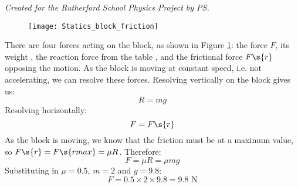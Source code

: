 
\begin{problem}
{}
{\textit{Created for the Rutherford School Physics Project by PS.}}
{
\begin{figure}
	\centering
	\texttt{[image: Statics\_block\_friction]}
	\caption{}
	\label{fig:Statics_block_friction}
\end{figure}
There are four forces acting on the block, as shown in Figure \ref{fig:Statics_block_friction}: the force $F$, its weight , the reaction force from the table , and the frictional force $F\s{r}$ opposing the motion. As the block is moving at constant speed, i.e. not accelerating, we can resolve these forces. Resolving vertically on the block gives us:
\begin{equation*}	R = mg	\end{equation*}
Resolving horizontally:
\begin{equation*} F = F\s{r}	\end{equation*}
As the block is moving, we know that the friction must be at a maximum value, so $F\s{r} = F\s{r max} = \mu R$. Therefore:
\begin{equation*} F = \mu R = \mu mg	\end{equation*}
Substituting in $\mu = 0.5$, $m = 2$ and $g = 9.8$:
\begin{equation*}	F = 0.5 \times 2 \times 9.8 = 9.8\textrm{ N}	\end{equation*}
}
\end{problem}